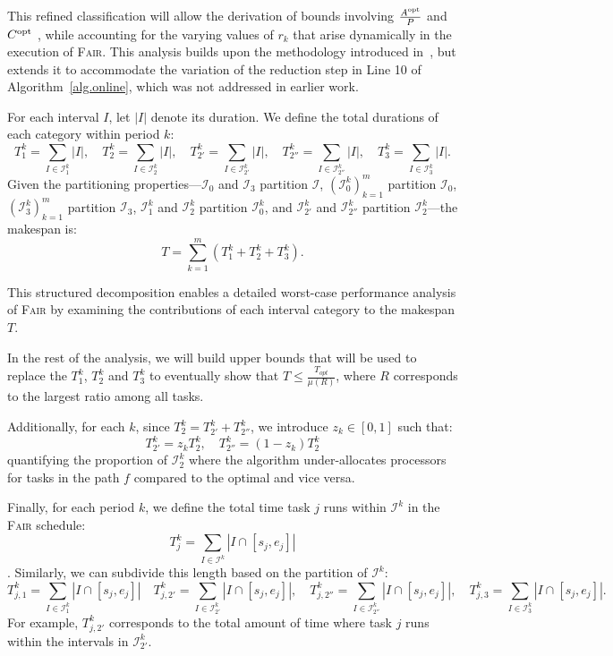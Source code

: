 \documentclass{article}
\newcommand\ratio{R\xspace}
\newcommand\rratio{r\xspace}
\newcommand\opt{\textnormal{opt}\xspace}
\begin{document}
This refined classification will allow the derivation of bounds involving $\frac{A^{\opt}}{P}$ and $C^{\opt}$ , while accounting for the varying values of \( \rratio_k \) that arise dynamically in the execution of \textsc{Fair}. This analysis builds upon the methodology introduced in~\cite{TOPC24}, but extends it to accommodate the variation of the reduction step in Line 10 of Algorithm~\ref{alg.online}, which was not addressed in earlier work.

\vspace{0.3cm}

For each interval $I$, let $|I|$ denote its duration. We define the total durations of each category within period $k$:
\[
T_1^k = \sum_{I \in \mathcal{I}_1^k} |I|, \quad T_2^k = \sum_{I \in \mathcal{I}_2^k} |I|, \quad T_{2'}^k = \sum_{I \in \mathcal{I}_{2'}^k} |I|, \quad T_{2''}^k = \sum_{I \in \mathcal{I}_{2''}^k} |I|, \quad T_3^k = \sum_{I \in \mathcal{I}_3^k} |I|.
\]
Given the partitioning properties—$\mathcal{I}_0$ and $\mathcal{I}_3$ partition $\mathcal{I}$, $(\mathcal{I}_0^k)_{k=1}^m$ partition $\mathcal{I}_0$, $(\mathcal{I}_3^k)_{k=1}^m$ partition $\mathcal{I}_3$, $\mathcal{I}_1^k$ and $\mathcal{I}_2^k$ partition $\mathcal{I}_0^k$, and $\mathcal{I}_{2'}^k$ and $\mathcal{I}_{2''}^k$ partition $\mathcal{I}_2^k$—the makespan is:
\[
T = \sum_{k=1}^m (T_1^k + T_2^k + T_3^k).
\]

This structured decomposition enables a detailed worst-case performance analysis of \textsc{Fair} by examining the contributions of each interval category to the makespan $T$.

In the rest of the analysis, we will build upper bounds that will be used to replace the $T_1^k$, $T_2^k$ and $T_3^k$ to eventually show that $T \leq \frac{T_{opt}}{\mu(\ratio)}$, where $\ratio$ corresponds to the largest ratio among all tasks.

Additionally, for each $k$, since $T_2^k = T_{2'}^k + T_{2''}^k$, we introduce $z_k \in [0,1]$ such that:
\begin{equation}
\label{eq.zk}
T_{2'}^k = z_k T_2^k, \quad T_{2''}^k = (1 - z_k) T_2^k
\end{equation}
quantifying the proportion of $\mathcal{I}_2^k$ where the algorithm under-allocates processors for tasks in the path $f$ compared to the optimal and vice versa.

Finally, for each period \( k \), we define the total time task \( j \) runs within \( \mathcal{I}^{k} \) in the \textsc{Fair} schedule: \[ T_{j}^{k} = \sum_{I \in \mathcal{I}^{k}} |I \cap [s_j, e_j]| \]. Similarly, we can subdivide this length based on the partition of $\mathcal{I}^{k}$:
\[
T_{j,1}^{k} = \sum_{I \in \mathcal{I}_{1}^{k}} |I \cap [s_j, e_j]|
\quad T_{j,2'}^{k} = \sum_{I \in \mathcal{I}_{2'}^{k}} |I \cap [s_j, e_j]|,\quad
T_{j,2''}^{k} = \sum_{I \in \mathcal{I}_{2''}^{k}} |I \cap [s_j, e_j]|,\quad
T_{j,3}^{k} = \sum_{I \in \mathcal{I}_{3}^{k}} |I \cap [s_j, e_j]|.
\]
For example, \(T_{j,2'}^{k}\) corresponds to the total amount of time where task \(j\) runs within the intervals in \(\mathcal{I}_{2'}^{k}\).
\medskip
\end{document}
